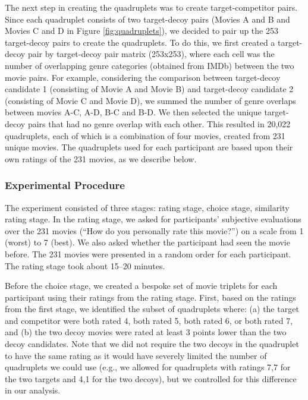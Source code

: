\documentclass[12pt, a4paper]{article}
\begin{document}
The next step in creating the quadruplets was to create target-competitor pairs. Since each quadruplet consists of two target-decoy pairs (Movies A and B and Movies C and D in Figure \ref{fig:quadruplets}), we decided to pair up the 253 target-decoy pairs to create the quadruplets. To do this, we first created a target-decoy pair by target-decoy pair matrix (253x253), where each cell was the number of overlapping genre categories (obtained from IMDb) between the two movie pairs. For example, considering the comparison between target-decoy candidate 1 (consisting of Movie A and Movie B) and target-decoy candidate 2 (consisting of Movie C and Movie D), we summed the number of genre overlaps between movies A-C, A-D, B-C and B-D. We then selected the unique target-decoy pairs that had no genre overlap with each other. This resulted in 20,022 quadruplets, each of which is a combination of four movies, created from 231 unique movies. The quadruplets used for each participant are based upon their own ratings of the 231 movies, as we describe below.

\subsubsection{Experimental Procedure}

The experiment consisted of three stages: rating stage, choice stage, similarity rating stage. In the rating stage, we asked for participants' subjective evaluations over the 231 movies (``How do you personally rate this movie?'') on a scale from 1 (worst) to 7 (best). We also asked whether the participant had seen the movie before. The 231 movies were presented in a random order for each participant. The rating stage took about 15--20 minutes.

Before the choice stage, we created a bespoke set of movie triplets for each participant using their ratings from the rating stage. First, based on the ratings from the first stage, we identified the subset of quadruplets where: (a) the target and competitor were both rated 4, both rated 5, both rated 6, or both rated 7, and (b) the two decoy movies were rated at least 3 points lower than the two decoy candidates. Note that we did not require the two decoys in the quadruplet to have the same rating as it would have severely limited the number of quadruplets we could use (e.g., we allowed for quadruplets with ratings 7,7 for the two targets and 4,1 for the two decoys), but we controlled for this difference in our analysis.
\end{document}
